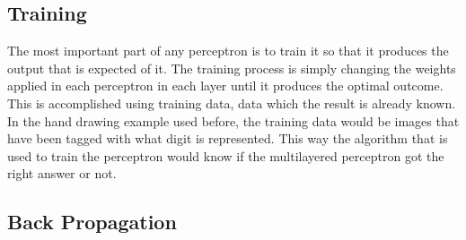 \subsection{Training}

The most important part of any perceptron is to train it so that it produces the output that is expected of it. The training process is simply changing the weights applied in each perceptron in each layer until it produces the optimal outcome. This is accomplished using training data, data which the result is already known. In the hand drawing example used before, the training data would be images that have been tagged with what digit is represented. This way the algorithm that is used to train the perceptron would know if the multilayered perceptron got the right answer or not.

\subsection{Back Propagation}

